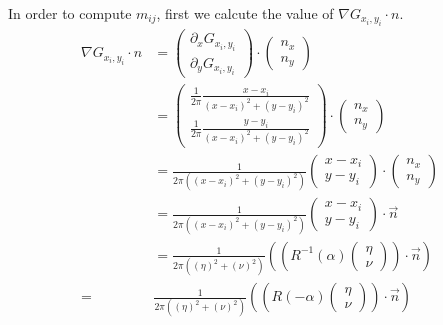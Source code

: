 \documentclass[a4paper,12pt]{article}
\begin{document}
\begin{enumerate}
In order to compute $m_{ij}$, first we calcute the value of $\nabla G_{x_i,y_i}\cdot n$.
\begin{align}
 \nabla G_{x_i,y_i}\cdot n&=\left(\begin{array}{c}
      \partial_x G_{x_i,y_i}\\
      \partial_y G_{x_i,y_i}
    \end{array}\right) \cdot \left(\begin{array}{c}
      n_x \\
      n_y
    \end{array}\right)\\
&=\left(\begin{array}{c}
      \frac{1}{2\pi} \frac{x-x_i}{(x-x_i)^2+(y-y_i)^2} \\
      \frac{1}{2\pi} \frac{y-y_i}{(x-x_i)^2+(y-y_i)^2}
    \end{array}\right) \cdot \left(\begin{array}{c}
      n_x \\
      n_y
    \end{array}\right)\\
&= \frac{1}{2\pi \left((x-x_i)^2+(y-y_i)^2 \right)}\left(\begin{array}{c}
     x-x_i \\
     y-y_i
    \end{array}\right)\cdot \left(\begin{array}{c}
      n_x \\
      n_y
    \end{array}\right)\\
                        &= \frac{1}{2\pi \left((x-x_i)^2+(y-y_i)^2 \right)}\left(\begin{array}{c}
     x-x_i \\
     y-y_i
    \end{array}\right)\cdot \vec{n}\\
&=\frac{1}{2\pi \left((\eta)^2+(\nu)^2 \right)} \left(\left(R^{-1}(\alpha)\left(\begin{array}{c}
     \eta \\
     \nu
    \end{array}\right)\right)\cdot \vec{n}\right)\\
=& \frac{1}{2\pi \left((\eta)^2+(\nu)^2 \right)} \left(\left(R(-\alpha)\left(\begin{array}{c}
     \eta \\
     \nu
    \end{array}\right)\right)\cdot \vec{n}\right)\\

\end{align}
\end{enumerate}
\end{document}
